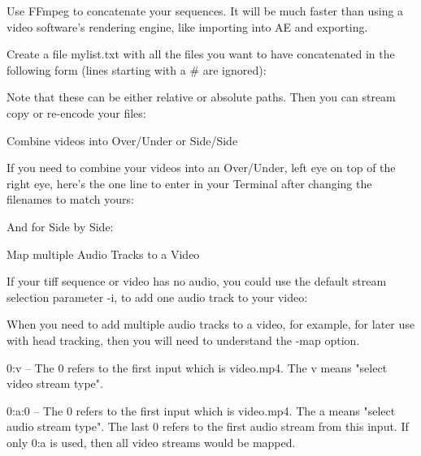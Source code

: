 \begin{fullwidth}
Use FFmpeg to concatenate your sequences. It will be much faster than using a video software’s rendering engine, like importing into AE and exporting.

Create a file mylist.txt with all the files you want to have concatenated in the following form (lines starting with a # are ignored):


Note that these can be either relative or absolute paths. Then you can stream copy or re-encode your files:


{\large Combine videos into Over/Under or Side/Side \par}

If you need to combine your videos into an Over/Under, left eye on top of the right eye, here’s the one line to enter in your Terminal after changing the filenames to match yours:


And for Side by Side:



{\large Map multiple Audio Tracks to a Video \par}

If your tiff sequence or video has no audio, you could use the default stream selection parameter -i, to add one audio track to your video: 


When you need to add multiple audio tracks to a video, for example, for later use with head tracking, then you will need to understand the -map option.


0:v – The 0 refers to the first input which is video.mp4. The v means "select video stream type".

0:a:0 – The 0 refers to the first input which is video.mp4. The a means "select audio stream type". The last 0 refers to the first audio stream from this input. If only 0:a is used, then all video streams would be mapped.


\end{fullwidth}
